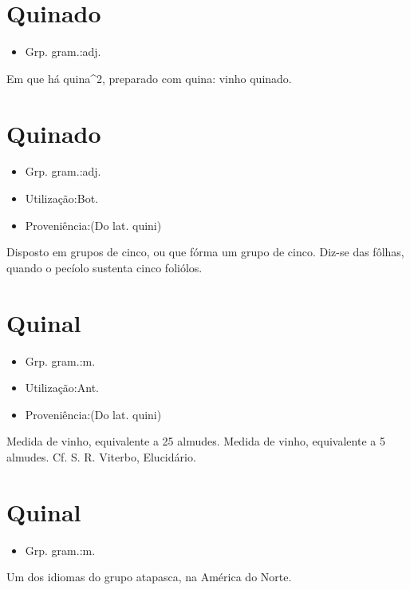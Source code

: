 \section{Quinado}
\begin{itemize}
\item {Grp. gram.:adj.}
\end{itemize}
Em que há quina^2, preparado com quina: \textunderscore vinho quinado\textunderscore .
\section{Quinado}
\begin{itemize}
\item {Grp. gram.:adj.}
\end{itemize}
\begin{itemize}
\item {Utilização:Bot.}
\end{itemize}
\begin{itemize}
\item {Proveniência:(Do lat. \textunderscore quini\textunderscore )}
\end{itemize}
Disposto em grupos de cinco, ou que fórma um grupo de cinco.
Diz-se das fôlhas, quando o pecíolo sustenta cinco foliólos.
\section{Quinal}
\begin{itemize}
\item {Grp. gram.:m.}
\end{itemize}
\begin{itemize}
\item {Utilização:Ant.}
\end{itemize}
\begin{itemize}
\item {Proveniência:(Do lat. \textunderscore quini\textunderscore )}
\end{itemize}
Medida de vinho, equivalente a 25 almudes.
Medida de vinho, equivalente a 5 almudes. Cf. S. R. Viterbo, \textunderscore Elucidário\textunderscore .
\section{Quinal}
\begin{itemize}
\item {Grp. gram.:m.}
\end{itemize}
Um dos idiomas do grupo atapasca, na América do Norte.
